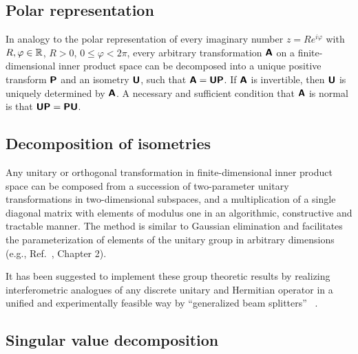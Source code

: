 \subsection{Polar representation}

In analogy to the polar representation of every imaginary number $z= R e^{i\varphi}$ with $R,\varphi \in {\Bbb R}$, $R>0$,
$0\le \varphi < 2\pi$,
every arbitrary transformation $\textsf{\textbf{A}}$ on a finite-dimensional inner product space can be decomposed into
a unique positive transform
$\textsf{\textbf{P}}$ and an isometry
$\textsf{\textbf{U}}$, such that $\textsf{\textbf{A}}= \textsf{\textbf{U}} \textsf{\textbf{P}}$.
If $\textsf{\textbf{A}}$ is invertible, then $\textsf{\textbf{U}}$  is uniquely determined by
$\textsf{\textbf{A}}$.
A necessary and sufficient condition that $\textsf{\textbf{A}}$ is normal is that
$\textsf{\textbf{U}} \textsf{\textbf{P}}=\textsf{\textbf{P}} \textsf{\textbf{U}} $.

\subsection{Decomposition of isometries}

Any unitary or orthogonal transformation   in finite-dimensional inner product space
can be composed from a succession of two-parameter unitary transformations in
two-dimensional subspaces,
and a multiplication of a single diagonal matrix with elements of modulus one
in an algorithmic, constructive and tractable manner.
The method is similar to Gaussian elimination and facilitates the parameterization of elements
of the unitary group  in arbitrary dimensions (e.g., Ref.~\cite{murnaghan}, Chapter 2).

{\color{Purple}
It has been suggested to implement
these group theoretic results by realizing interferometric analogues
of any discrete unitary and Hermitian operator
in a unified and experimentally feasible way by ``generalized beam splitters''  ~\cite{rzbb,reck-94}.}


\subsection{Singular value decomposition}

